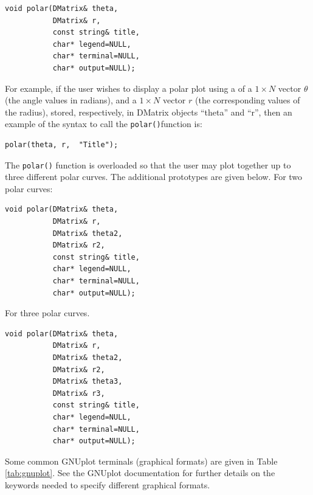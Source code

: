 \documentclass[a4paper,11pt]{report}    %
\newenvironment{shadedframe}{%
  \def\FrameCommand{\fcolorbox{black}{shadecolor}}%
  \MakeFramed {\FrameRestore}}
{\endMakeFramed}
\begin{document}
\begin{verbatim}
void polar(DMatrix& theta, 
           DMatrix& r, 
           const string& title,  
           char* legend=NULL, 
           char* terminal=NULL, 
           char* output=NULL);
\end{verbatim}


\begin{shadedframe}

For example, if the user wishes to display a polar plot using a of a $1 \times N$ vector $\theta$ (the angle
values in radians), and a $1 \times N$ vector $r$ (the corresponding values of the radius), stored, respectively, 
in DMatrix objects ``theta'' and ``r'',  then an example of the syntax to call the \texttt{polar()}function is:

\begin{verbatim}
polar(theta, r,  "Title"); 
\end{verbatim}


\end{shadedframe}

The \texttt{polar()} function is overloaded so that the user may plot together up to three different
polar curves. The additional prototypes are given below.  For two polar curves:
\begin{verbatim}
void polar(DMatrix& theta, 
           DMatrix& r, 
           DMatrix& theta2, 
           DMatrix& r2, 
           const string& title,  
           char* legend=NULL, 
           char* terminal=NULL, 
           char* output=NULL);  
\end{verbatim}

\noindent For three polar curves.
\begin{verbatim}
void polar(DMatrix& theta, 
           DMatrix& r, 
           DMatrix& theta2, 
           DMatrix& r2,  
           DMatrix& theta3, 
           DMatrix& r3, 
           const string& title,  
           char* legend=NULL, 
           char* terminal=NULL, 
           char* output=NULL); 
\end{verbatim}


Some common GNUplot terminals (graphical formats) are given in Table \ref{tab:gnuplot}. 
See the GNUplot documentation for further details on the keywords needed to specify
different graphical formats.
\end{document}
